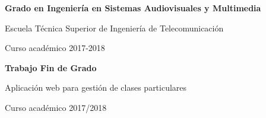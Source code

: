 \documentclass[oneside,a4paper,11pt]{book}
\begin{document}
\vspace{5mm}
\begin{center}
{\Large {\bf Grado en Ingeniería en Sistemas Audiovisuales y Multimedia}}
\vspace{5mm}

{\large Escuela Técnica Superior de Ingeniería de Telecomunicación}
\vspace{5mm}

{\large Curso académico 2017-2018}

\vspace{1.0cm}

{\large {\bf Trabajo Fin de Grado}}

\vspace{2cm}
{\Huge {Aplicación web para gestión de clases particulares}}


\vspace{4cm}
\end{center}
\vspace{0.5cm}
\begin{center}
\large{Curso académico 2017/2018}
\end{center}



\clearpage
\thispagestyle{empty}

\vspace{5cm}



\end{document}
